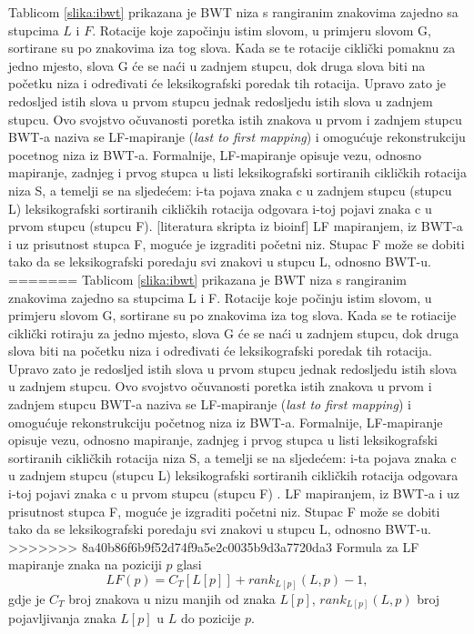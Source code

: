 \documentclass{ferseminar}
\begin{document}
Tablicom \ref{slika:ibwt} prikazana je BWT niza s rangiranim znakovima zajedno sa stupcima $L$ i $F$. Rotacije koje započinju istim slovom, u primjeru slovom G, sortirane su po znakovima iza tog slova. Kada se te rotacije ciklički pomaknu za jedno mjesto, slova G će se naći u zadnjem stupcu, dok druga slova biti na početku niza i određivati će leksikografski poredak tih rotacija. Upravo zato je redosljed istih slova u prvom stupcu jednak redosljedu istih slova u zadnjem stupcu. Ovo svojstvo očuvanosti poretka istih znakova u prvom i zadnjem stupcu BWT-a naziva se LF-mapiranje (\textit{last to first mapping}) i omogućuje rekonstrukciju pocetnog niza iz BWT-a. Formalnije, LF-mapiranje opisuje vezu, odnosno mapiranje, zadnjeg i prvog stupca u listi leksikografski sortiranih cikličkih rotacija niza S, a temelji se na sljedećem: i-ta pojava znaka c u zadnjem stupcu (stupcu L) leksikografski sortiranih cikličkih rotacija
odgovara i-toj pojavi znaka c u prvom stupcu (stupcu F). [literatura skripta iz bioinf] LF mapiranjem, iz BWT-a i uz prisutnost stupca F, moguće je izgraditi početni niz. Stupac F može se dobiti tako da se leksikografski poredaju svi znakovi u stupcu L, odnosno BWT-u.
=======
Tablicom \ref{slika:ibwt} prikazana je BWT niza s rangiranim znakovima zajedno sa stupcima L i F. Rotacije koje počinju istim slovom, u primjeru slovom G, sortirane su po znakovima iza tog slova. Kada se te rotiacije ciklički rotiraju za jedno mjesto, slova G će se naći u zadnjem stupcu, dok druga slova biti na početku niza i određivati će leksikografski poredak tih rotacija. Upravo zato je redosljed istih slova u prvom stupcu jednak redosljedu istih slova u zadnjem stupcu. Ovo svojstvo očuvanosti poretka istih znakova u prvom i zadnjem stupcu BWT-a naziva se LF-mapiranje (\textit{last to first mapping}) i omogućuje rekonstrukciju početnog niza iz BWT-a. Formalnije, LF-mapiranje opisuje vezu, odnosno mapiranje, zadnjeg i prvog stupca u listi leksikografski sortiranih cikličkih rotacija niza S, a temelji se na sljedećem: i-ta pojava znaka c u zadnjem stupcu (stupcu L) leksikografski sortiranih cikličkih rotacija
odgovara i-toj pojavi znaka c u prvom stupcu (stupcu F) \cite{skripta}. LF mapiranjem, iz BWT-a i uz prisutnost stupca F, moguće je izgraditi početni niz. Stupac F može se dobiti tako da se leksikografski poredaju svi znakovi u stupcu L, odnosno BWT-u.
>>>>>>> 8a40b86f6b9f52d74f9a5e2c0035b9d3a7720da3
Formula za LF mapiranje znaka na poziciji $p$ glasi 
\begin{equation}
	LF(p)=C_T[L[p]]+rank_{L[p]}(L,p)-1 ,
\end{equation}
gdje je $C_T$ broj znakova u nizu manjih od znaka $L[p]$, $rank_{L[p]}(L,p)$ broj pojavljivanja znaka $L[p]$ u $L$ do pozicije $p$.
\end{document}
